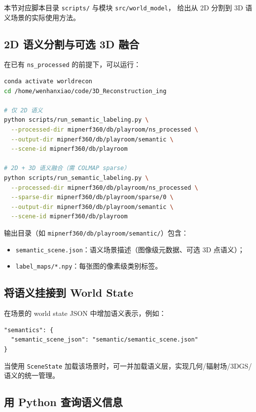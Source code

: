 \documentclass[12pt]{ctexart}
\begin{document}
本节对应脚本目录 \texttt{scripts/} 与模块 \texttt{src/world\_model}，
给出从 2D 分割到 3D 语义场景的实际使用方法。

\subsection{2D 语义分割与可选 3D 融合}

在已有 \texttt{ns\_processed} 的前提下，可以运行：
\begin{lstlisting}[language=bash]
conda activate worldrecon
cd /home/wenhanxiao/code/3D_Reconstruction_ing

# 仅 2D 语义
python scripts/run_semantic_labeling.py \
  --processed-dir mipnerf360/db/playroom/ns_processed \
  --output-dir mipnerf360/db/playroom/semantic \
  --scene-id mipnerf360/db/playroom

# 2D + 3D 语义融合（需 COLMAP sparse）
python scripts/run_semantic_labeling.py \
  --processed-dir mipnerf360/db/playroom/ns_processed \
  --sparse-dir mipnerf360/db/playroom/sparse/0 \
  --output-dir mipnerf360/db/playroom/semantic \
  --scene-id mipnerf360/db/playroom
\end{lstlisting}

输出目录（如 \texttt{mipnerf360/db/playroom/semantic/}）包含：
\begin{itemize}
  \item \texttt{semantic\_scene.json}：语义场景描述（图像级元数据、可选 3D 点语义）；
  \item \texttt{label\_maps/*.npy}：每张图的像素级类别标签。
\end{itemize}

\subsection{将语义挂接到 World State}

在场景的 world state JSON 中增加语义表示，例如：
\begin{lstlisting}
"semantics": {
  "semantic_scene_json": "semantic/semantic_scene.json"
}
\end{lstlisting}

当使用 \texttt{SceneState} 加载该场景时，可一并加载语义层，实现几何/辐射场/3DGS/语义的统一管理。

\subsection{用 Python 查询语义信息}
\end{document}
